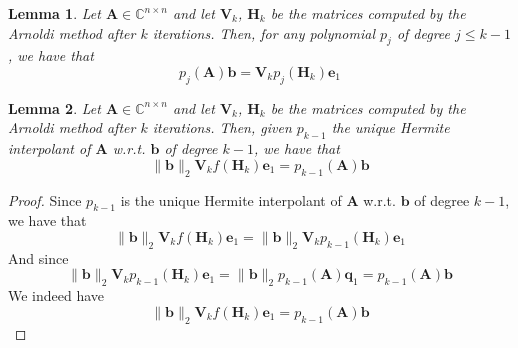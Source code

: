 \documentclass[11pt]{article}
\newtheorem{lemma}{Lemma}[section]
\numberwithin{equation}{section}
\begin{document}
\begin{lemma}\label{lem:arnoldi2}
    Let $\mathbf{A}\in\mathbb{C}^{n\times n}$ and let $\mathbf{V}_k$, $\mathbf{H}_k$ be the matrices computed by the Arnoldi method after $k$ iterations. Then, for any polynomial $p_j$ of degree $j\leq k-1$, we have that
    \begin{equation}
        p_j(\mathbf{A})\mathbf{b} = \mathbf{V}_kp_j(\mathbf{H}_k)\mathbf{e}_1
    \end{equation}
\end{lemma}

\begin{lemma}\label{lem:arnoldi3}
    Let $\mathbf{A}\in\mathbb{C}^{n\times n}$ and let $\mathbf{V}_k$, $\mathbf{H}_k$ be the matrices computed by the Arnoldi method after $k$ iterations. Then, given $p_{k-1}$ the unique Hermite interpolant of $\mathbf{A}$ w.r.t. $\mathbf{b}$ of degree $k-1$, we have that
    \begin{equation}
        \|\mathbf{b}\|_2\mathbf{V}_k f(\mathbf{H}_k)\mathbf{e}_1 = p_{k-1}(\mathbf{A})\mathbf{b}
    \end{equation}
\end{lemma}
\begin{proof}
    Since $p_{k-1}$ is the unique Hermite interpolant of $\mathbf{A}$ w.r.t. $\mathbf{b}$ of degree $k-1$, we have that
    \begin{equation*}
        \|\mathbf{b}\|_2\mathbf{V}_k f(\mathbf{H}_k)\mathbf{e}_1 = \|\mathbf{b}\|_2\mathbf{V}_k p_{k-1}(\mathbf{H}_k)\mathbf{e}_1
    \end{equation*}
    And since 
    \begin{equation*}
        \|\mathbf{b}\|_2\mathbf{V}_k p_{k-1}(\mathbf{H}_k)\mathbf{e}_1 = \|\mathbf{b}\|_2p_{k-1}(\mathbf{A})\mathbf{q}_1 = p_{k-1}(\mathbf{A})\mathbf{b}
    \end{equation*}
    We indeed have
    \begin{equation*}
        \|\mathbf{b}\|_2\mathbf{V}_k f(\mathbf{H}_k)\mathbf{e}_1 = p_{k-1}(\mathbf{A})\mathbf{b}
    \end{equation*}
\end{proof}
\end{document}
